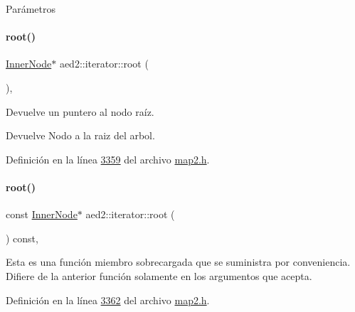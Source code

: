 \begin{DoxyParams}{\-Parámetros}
\begin{DoxyCompactItemize}
\paragraph{\texorpdfstring{root()}{root()}\hspace{0.1cm}{\footnotesize\ttfamily [1/2]}}
{\footnotesize\ttfamily \hyperlink{structaed2_1_1iterator_1_1InnerNode}{Inner\+Node}$\ast$ aed2\+::iterator\+::root (\begin{DoxyParamCaption}{ }\end{DoxyParamCaption})\hspace{0.3cm}{\ttfamily [inline]}, {\ttfamily [private]}}



Devuelve un puntero al nodo raíz. 

\begin{DoxyReturn}{Devuelve}
Nodo a la raiz del arbol. 
\end{DoxyReturn}


Definición en la línea \hyperlink{map2_8h_source_l03359}{3359} del archivo \hyperlink{map2_8h_source}{map2.\+h}.

\mbox{\label{classaed2_1_1iterator_af8ec6345324ba983e64f210ccbc90b2c_af8ec6345324ba983e64f210ccbc90b2c}} 
\paragraph{\texorpdfstring{root()}{root()}\hspace{0.1cm}{\footnotesize\ttfamily [2/2]}}
{\footnotesize\ttfamily const \hyperlink{structaed2_1_1iterator_1_1InnerNode}{Inner\+Node}$\ast$ aed2\+::iterator\+::root (\begin{DoxyParamCaption}{ }\end{DoxyParamCaption}) const\hspace{0.3cm}{\ttfamily [inline]}, {\ttfamily [private]}}

Esta es una función miembro sobrecargada que se suministra por conveniencia. Difiere de la anterior función solamente en los argumentos que acepta. 

Definición en la línea \hyperlink{map2_8h_source_l03362}{3362} del archivo \hyperlink{map2_8h_source}{map2.\+h}.

\mbox{\label{classaed2_1_1iterator_ada09b8f1fe307abe0b9e01401e2172e1_ada09b8f1fe307abe0b9e01401e2172e1}} 

\end{DoxyCompactItemize}
\end{DoxyParams}
